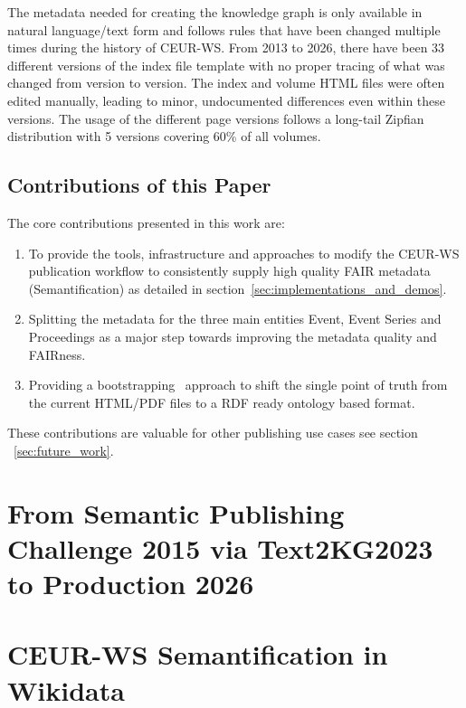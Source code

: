 \documentclass[runningheads]{llncs}
\begin{document}
The metadata needed for creating the knowledge graph is only available in natural language/text form and follows rules that have been changed multiple times during the history of CEUR-WS. From 2013 to 2026, there have been 33 different versions of the index file template with no proper tracing of what was changed from version to version. The index and volume HTML files were often edited manually, leading to minor, undocumented differences even within these versions. The usage of the different page versions follows a long-tail Zipfian distribution with 5 versions covering 60\% of all volumes.

\subsection{Contributions of this Paper}
The core contributions presented in this work are:
\begin{enumerate}
    \item To provide the tools, infrastructure and approaches to modify the CEUR-WS publication workflow to consistently supply high quality FAIR metadata (Semantification) as detailed in section~\ref{sec:implementations_and_demos}.

    \item Splitting the metadata for the three main entities Event, Event Series and Proceedings as a major step towards improving the metadata quality and FAIRness.

    \item Providing a bootstrapping~\cite{Bardini2001,Engelbart2007} approach to shift the single point of truth from the current HTML/PDF files to a RDF ready ontology based format.

\end{enumerate}

These contributions are valuable for other publishing use cases see section ~\ref{sec:future_work}.

\section{From Semantic Publishing Challenge 2015 via Text2KG2023 to Production 2026}\label{sec:SemantificationStory}

\section{CEUR-WS Semantification in Wikidata}\label{sec:Semantification}
\end{document}
